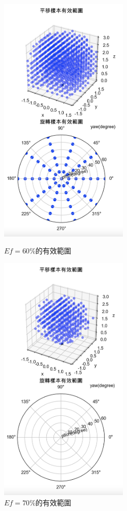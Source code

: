 \begin{figure}[htpb]
    \centering
    \begin{minipage}{.5\textwidth}
        \centering
        \includegraphics[height = 12cm]{ch4pic/ef60.png}
        \caption{$Ef=60\%$的有效範圍}
        \label{pic:ef60}
    \end{minipage}%
    \begin{minipage}{0.5\textwidth}
        \centering
        \includegraphics[height = 12cm]{ch4pic/ef70.png}
        \caption{$Ef=70\%$的有效範圍}
        \label{pic:ef70}
    \end{minipage}
\end{figure}


